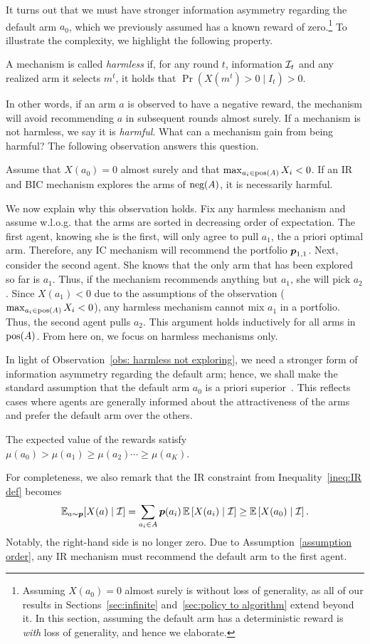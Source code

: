 It turns out that we must have stronger information asymmetry regarding the default arm $a_0$, which we previously assumed has a known reward of zero.\footnote{Assuming $X(a_0)=0$ almost surely is without loss of generality, as all of our results in Sections~\ref{sec:infinite} and~\ref{sec:policy to algorithm} extend beyond it. In this section, assuming the default arm has a deterministic reward is \emph{with} loss of generality, and hence we elaborate.} To illustrate the complexity, we highlight the following property.
\begin{definition}
    A mechanism is called \emph{harmless} if, for any round $t$, information $\mathcal{I}_t$ and any realized arm it selects $m^t$, it holds that $\Pr(X(m^t)>0\mid I_t)>0$.
\end{definition}
In other words, if an arm $a$ is observed to have a negative reward, the mechanism will avoid recommending $a$ in subsequent rounds almost surely. If a mechanism is not harmless, we say it is \emph{harmful}. What can a mechanism gain from being harmful? The following observation answers this question.
\begin{observation}\label{obs: harmless not exploring}
Assume that $X(a_0)=0$ almost surely and that $\max_{a_i\in \textnormal{pos}(A)}X_i <0$. If an IR and BIC mechanism explores the arms of $\textnormal{neg}(A)$, it is necessarily harmful.
\end{observation}
We now explain why this observation holds. Fix any harmless mechanism and assume w.l.o.g. that the arms are sorted in decreasing order of expectation. The first agent, knowing she is the first, will only agree to pull $a_1$, the a priori optimal arm. Therefore, any IC mechanism will recommend the portfolio $\boldsymbol{ p }_{1,1}$. Next, consider the second agent. She knows that the only arm that has been explored so far is $a_1$. Thus, if the mechanism recommends anything but $a_1$, she will pick $a_2$. Since $X(a_1)<0$ due to the assumptions of the observation ($\max_{a_i\in \textnormal{pos}(A)}X_i <0$), any harmless mechanism cannot mix $a_1$ in a portfolio. Thus, the second agent pulls $a_2$. This argument holds inductively for all arms in $\textnormal{pos}(A)$.  From here on, we focus on harmless mechanisms only. 

In light of Observation~\ref{obs: harmless not exploring}, we need a stronger form of information asymmetry regarding the default arm; hence, we shall make the standard assumption that the default arm $a_0$ is a priori superior~\cite{Fiduciary,Kremer2014}. This reflects cases where agents are generally informed about the attractiveness of the arms and prefer the default arm over the others. 
\begin{assumption}\label{assumption order}
The expected value of the rewards satisfy $\mu(a_0)>\mu(a_1)\geq \mu(a_2)\cdots \geq \mu(a_K)$.
\end{assumption}
For completeness, we also remark that the IR constraint from Inequality~\eqref{ineq:IR def} becomes
\[
\operatorname{\mathbb{E}}_{a\sim \boldsymbol{ p }}[X(a) \mid \mathcal{I}]=\sum_{a_i\in A}\boldsymbol{ p } (a_i)\operatorname{\mathbb{E}}\left[X(a_i)\mid \mathcal{I}\right]\geq\operatorname{\mathbb{E}}\left[X(a_0)\mid \mathcal{I}\right].
\]
Notably, the right-hand side is no longer zero. Due to Assumption~\ref{assumption order}, any IR mechanism must recommend the default arm to the first agent. 


